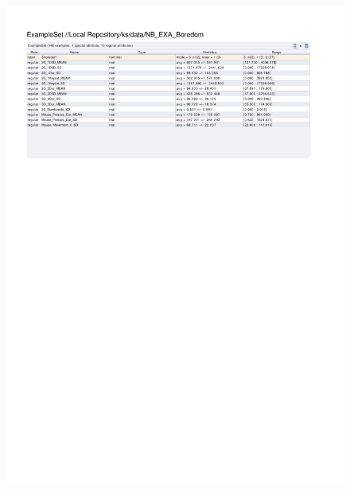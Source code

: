 \begin{figure}[htp]
  \centerline{\includegraphics[trim=0 620 0 60,clip,width=16.09cm]{results/NB_EXA_Boredom.pdf}} \caption{
} \label{NB_K_Boredom}
\end{figure}

